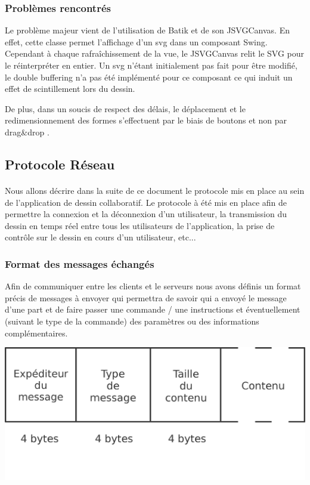\documentclass[a4paper,11pt]{article}
\begin{document}
\subsubsection{Probl\`emes rencontr\'es}

Le probl\`eme majeur vient de l'utilisation de Batik et de son JSVGCanvas. En effet, cette classe permet l'affichage d'un svg dans un composant Swing. Cependant \`a chaque rafra\^ichissement de la vue, le JSVGCanvas relit le SVG pour le r\'einterpr\'eter en entier. Un svg n'étant initialement pas fait pour être modifié, le double buffering n'a pas été implémenté pour ce composant ce qui induit un effet de scintillement lors du dessin. 

De plus, dans un soucis de respect des d\'elais, le d\'eplacement et le redimensionnement des formes s'effectuent par le biais de boutons et non par \og drag\&drop \fg.

\subsection{Protocole Réseau}

\paragraph{} Nous allons décrire dans la suite de ce document le protocole mis en place au sein de l'application de dessin collaboratif. Le protocole à été mis en place afin de permettre la connexion et la déconnexion d'un utilisateur, la transmission du dessin en temps réel entre tous les utilisateurs de l'application, la prise de contrôle sur le dessin en cours d'un utilisateur, etc... 

\subsubsection{Format des messages échangés}
Afin de communiquer entre les clients et le serveurs nous avons définis un format précis de messages à envoyer qui permettra de savoir qui a envoyé le message d'une part et de faire passer une commande / une instructions et éventuellement (suivant le type de la commande) des paramètres ou des informations complémentaires.


\includegraphics[scale=0.5]{image/message.png}
\end{document}
